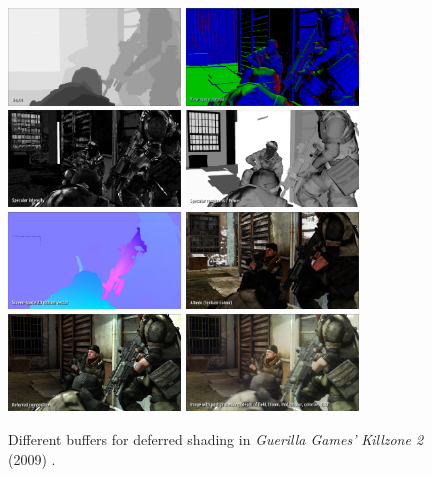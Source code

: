 \begin{figure}[h]
    \centering
    \includegraphics[width=173px]{images/graphics/killzone-2-buffer-depth.jpg}
    \includegraphics[width=173px]{images/graphics/killzone-2-buffer-vsn.jpg}
    \includegraphics[width=173px]{images/graphics/killzone-2-buffer-specular.jpg}
    \includegraphics[width=173px]{images/graphics/killzone-2-buffer-specular-rough.jpg}
    \includegraphics[width=173px]{images/graphics/killzone-2-buffer-ss-motion.jpg}
    \includegraphics[width=173px]{images/graphics/killzone-2-buffer-albedo.jpg}
    \includegraphics[width=173px]{images/graphics/killzone-2-buffer-composed-result.jpg}
    \includegraphics[width=173px]{images/graphics/killzone-2-buffer-post.jpg}
    \caption{Different buffers for deferred shading in \emph{Guerilla Games'} \emph{Killzone 2} (2009) 
    \cite{Valient2007}.}
    \label{fig:deferred-shading-buffers}
\end{figure}

